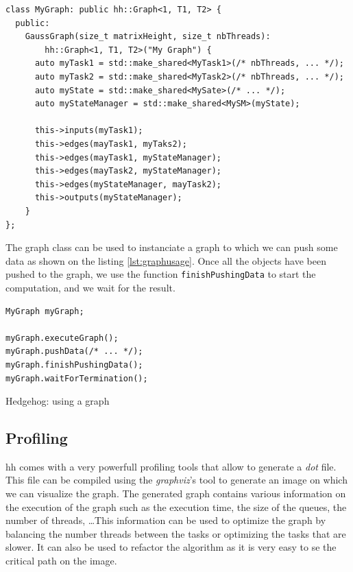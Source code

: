 \begin{listing}[ht!]
\begin{verbatim}
class MyGraph: public hh::Graph<1, T1, T2> {
  public:
    GaussGraph(size_t matrixHeight, size_t nbThreads):
        hh::Graph<1, T1, T2>("My Graph") {
      auto myTask1 = std::make_shared<MyTask1>(/* nbThreads, ... */);
      auto myTask2 = std::make_shared<MyTask2>(/* nbThreads, ... */);
      auto myState = std::make_shared<MySate>(/* ... */);
      auto myStateManager = std::make_shared<MySM>(myState);

      this->inputs(myTask1);
      this->edges(mayTask1, myTaks2);
      this->edges(mayTask1, myStateManager);
      this->edges(mayTask2, myStateManager);
      this->edges(myStateManager, mayTask2);
      this->outputs(myStateManager);
    }
};
\end{verbatim}
\label{lst:graph}
\end{listing}

The graph class can be used to instanciate a graph to which we can push some
data as shown on the listing \ref{lst:graphusage}. Once all the objects have been
pushed to the graph, we use the function \texttt{finishPushingData} to start the
computation, and we wait for the result.

\begin{listing}[ht!]
\begin{verbatim}
MyGraph myGraph;

myGraph.executeGraph();
myGraph.pushData(/* ... */);
myGraph.finishPushingData();
myGraph.waitForTermination();
\end{verbatim}
\caption{Hedgehog: using a graph}
\label{lst:graphusage}
\end{listing}

\subsection{Profiling}

\gls{hh} comes with a very powerfull profiling tools that allow to generate a
\textit{dot} file. This file can be compiled using the \textit{graphviz}'s tool
to generate an image on which we can visualize the graph. The generated graph
contains various information on the execution of the graph such as the execution
time, the size of the queues, the number of threads, \dots This information can
be used to optimize the graph by balancing the number threads between the tasks
or optimizing the tasks that are slower. It can also be used to refactor the
algorithm as it is very easy to se the critical path on the image.

